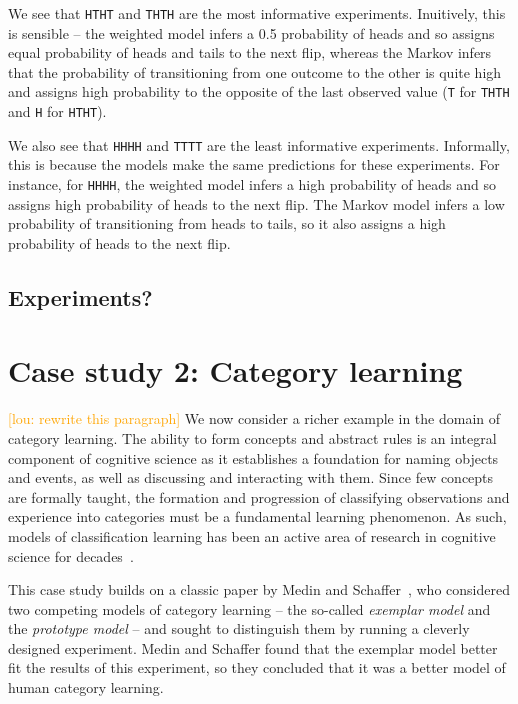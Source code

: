 \documentclass{article}
\newcommand{\lou}[1]{\textcolor{orange}{[lou: #1]}}
\begin{document}
We see that \lstinline{HTHT} and \lstinline{THTH} are the most informative experiments.
Inuitively, this is sensible -- the weighted model infers a 0.5 probability of heads and so assigns equal probability of heads and tails to the next flip, whereas the Markov infers that the probability of transitioning from one outcome to the other is quite high and assigns high probability to the opposite of the last observed value (\lstinline{T} for \lstinline{THTH} and \lstinline{H} for \lstinline{HTHT}).

We also see that \lstinline{HHHH} and \lstinline{TTTT} are the least informative experiments.
Informally, this is because the models make the same predictions for these experiments.
For instance, for \lstinline{HHHH}, the weighted model infers a high probability of heads and so assigns high probability of heads to the next flip.
The Markov model infers a low probability of transitioning from heads to tails, so it also assigns a high probability of heads to the next flip.

\subsection{Experiments?}


\section{Case study 2: Category learning}

\lou{rewrite this paragraph}
We now consider a richer example in the domain of category learning.
The ability to form concepts and abstract rules is an integral component of cognitive science as it establishes a foundation for naming objects and events, as well as discussing and interacting with them.
Since few concepts are formally taught, the formation and progression of classifying observations and experience into categories must be a fundamental learning phenomenon.
As such, models of classification learning has been an active area of research in cognitive science for decades~\cite{machery10:bbs}.

This case study builds on a classic paper by Medin and Schaffer~\cite{medin78:pr}, who considered two competing models of category learning -- the so-called \emph{exemplar model} and the \emph{prototype model} -- and sought to distinguish them by running a cleverly designed experiment.
Medin and Schaffer found that the exemplar model better fit the results of this experiment, so they concluded that it was a better model of human category learning.
\end{document}
